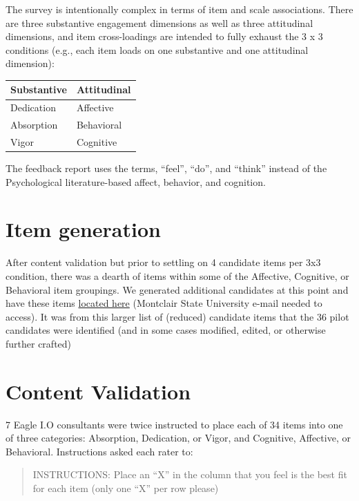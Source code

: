 \documentclass[
]{book}
\begin{document}
The survey is intentionally complex in terms of item and scale associations. There are three substantive engagement dimensions as well as three attitudinal dimensions, and item cross-loadings are intended to fully exhaust the 3 x 3 conditions (e.g., each item loads on one substantive and one attitudinal dimension):

\begin{longtable}[]{@{}ll@{}}
\toprule
Substantive & Attitudinal\tabularnewline
\midrule
\endhead
Dedication & Affective\tabularnewline
Absorption & Behavioral\tabularnewline
Vigor & Cognitive\tabularnewline
\bottomrule
\end{longtable}

The feedback report uses the terms, ``feel'', ``do'', and ``think'' instead of the Psychological literature-based affect, behavior, and cognition.

\hypertarget{item-generation}{%
\section{Item generation}\label{item-generation}}

After content validation but prior to settling on 4 candidate items per 3x3 condition, there was a dearth of items within some of the Affective, Cognitive, or Behavioral item groupings. We generated additional candidates at this point and have these items \href{https://docs.google.com/document/d/1whB4Ve4aDDl3bxx3dIlloouTDy1ScCcxrT3gK6s9DyU/edit?usp=sharing}{located here} (Montclair State University e-mail needed to access). It was from this larger list of (reduced) candidate items that the 36 pilot candidates were identified (and in some cases modified, edited, or otherwise further crafted)

\hypertarget{CValid}{%
\section{Content Validation}\label{CValid}}

7 Eagle I.O consultants were twice instructed to place each of 34 items into one of three categories: Absorption, Dedication, or Vigor, and Cognitive, Affective, or Behavioral. Instructions asked each rater to:

\begin{quote}
INSTRUCTIONS: Place an ``X'' in the column that you feel is the best fit for each item (only one ``X'' per row please)
\end{quote}
\end{document}
